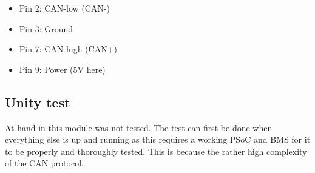 	\begin{itemize}
		\item Pin 2: CAN-low (CAN-)
		\item Pin 3: Ground
		\item Pin 7: CAN-high (CAN+)
		\item Pin 9: Power (5V here)
	\end{itemize} 

\subsection{Unity test}
At hand-in this module was not tested. The test can first be done when everything else is up and running as this requires a working PSoC and BMS for it to be properly and thoroughly tested. This is because the rather high complexity of the CAN protocol. 